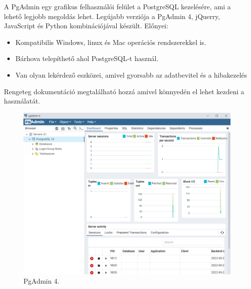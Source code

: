 A PgAdmin\cite{PgAdmin} egy grafikus felhasználói felület a PostgreSQL kezelésére, ami a lehető legjobb megoldás lehet. Legújabb verziója a PgAdmin 4, jQuerry, JavaScript és Python kombinációjával készült. Előnyei:

\begin{itemize}
\item Kompatibilis Windows, linux és Mac operációs rendszerekkel is.
\item Bárhova telepíthető ahol PostgreSQL-t használ.
\item Van olyan lekérdező eszközei, amivel gyorsabb az adatbevitel és a hibakezelés
\end{itemize}

Rengeteg dokumentáció megtalálható hozzá amivel könnyedén el lehet kezdeni a használatát.

\begin{figure}[h]
\centering
\includegraphics[scale=0.5]{images/PgAdmin.png}
\caption{PgAdmin 4.}
\label{fig:PgAdmin 4}
\end{figure}
\newpage

